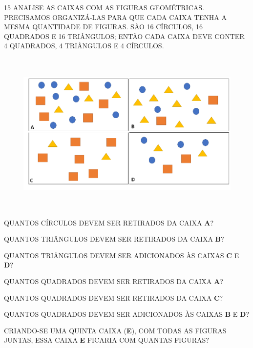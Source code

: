 \num{15} ANALISE AS CAIXAS COM AS FIGURAS GEOMÉTRICAS. PRECISAMOS ORGANIZÁ-LAS PARA QUE CADA CAIXA TENHA A MESMA QUANTIDADE DE FIGURAS. SÃO 16 CÍRCULOS, 16 QUADRADOS E 16 TRIÂNGULOS; ENTÃO CADA CAIXA DEVE CONTER 4 QUADRADOS, 4 TRIÂNGULOS E 4 CÍRCULOS.


\begin{figure}[htpb!]
\includegraphics[width=5.90556in,height=3.22917in]{media/image20.png}
\end{figure}

\begin{escolha}
\item QUANTOS CÍRCULOS DEVEM SER RETIRADOS DA CAIXA \textbf{A}?


\item QUANTOS TRIÂNGULOS DEVEM SER RETIRADOS DA CAIXA \textbf{B}?


\item QUANTOS TRIÂNGULOS DEVEM SER ADICIONADOS ÀS CAIXAS \textbf{C} E \textbf{D}?


\item QUANTOS QUADRADOS DEVEM SER RETIRADOS DA CAIXA \textbf{A}?


\item QUANTOS QUADRADOS DEVEM SER RETIRADOS DA CAIXA \textbf{C}?


\item QUANTOS QUADRADOS DEVEM SER ADICIONADOS ÀS CAIXAS \textbf{B} E \textbf{D}?


\item CRIANDO-SE UMA QUINTA CAIXA (\textbf{E}), COM TODAS AS FIGURAS JUNTAS, ESSA CAIXA \textbf{E} FICARIA COM QUANTAS FIGURAS?

\end{escolha}

